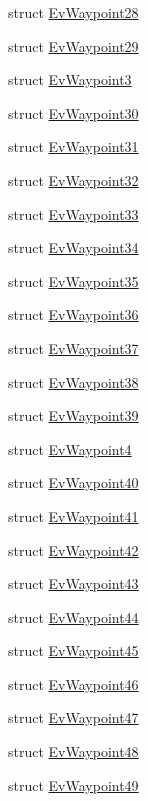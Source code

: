 \begin{DoxyCompactItemize}
\item 
struct \hyperlink{structsmacc_1_1EvWaypoint28}{Ev\+Waypoint28}
\item 
struct \hyperlink{structsmacc_1_1EvWaypoint29}{Ev\+Waypoint29}
\item 
struct \hyperlink{structsmacc_1_1EvWaypoint3}{Ev\+Waypoint3}
\item 
struct \hyperlink{structsmacc_1_1EvWaypoint30}{Ev\+Waypoint30}
\item 
struct \hyperlink{structsmacc_1_1EvWaypoint31}{Ev\+Waypoint31}
\item 
struct \hyperlink{structsmacc_1_1EvWaypoint32}{Ev\+Waypoint32}
\item 
struct \hyperlink{structsmacc_1_1EvWaypoint33}{Ev\+Waypoint33}
\item 
struct \hyperlink{structsmacc_1_1EvWaypoint34}{Ev\+Waypoint34}
\item 
struct \hyperlink{structsmacc_1_1EvWaypoint35}{Ev\+Waypoint35}
\item 
struct \hyperlink{structsmacc_1_1EvWaypoint36}{Ev\+Waypoint36}
\item 
struct \hyperlink{structsmacc_1_1EvWaypoint37}{Ev\+Waypoint37}
\item 
struct \hyperlink{structsmacc_1_1EvWaypoint38}{Ev\+Waypoint38}
\item 
struct \hyperlink{structsmacc_1_1EvWaypoint39}{Ev\+Waypoint39}
\item 
struct \hyperlink{structsmacc_1_1EvWaypoint4}{Ev\+Waypoint4}
\item 
struct \hyperlink{structsmacc_1_1EvWaypoint40}{Ev\+Waypoint40}
\item 
struct \hyperlink{structsmacc_1_1EvWaypoint41}{Ev\+Waypoint41}
\item 
struct \hyperlink{structsmacc_1_1EvWaypoint42}{Ev\+Waypoint42}
\item 
struct \hyperlink{structsmacc_1_1EvWaypoint43}{Ev\+Waypoint43}
\item 
struct \hyperlink{structsmacc_1_1EvWaypoint44}{Ev\+Waypoint44}
\item 
struct \hyperlink{structsmacc_1_1EvWaypoint45}{Ev\+Waypoint45}
\item 
struct \hyperlink{structsmacc_1_1EvWaypoint46}{Ev\+Waypoint46}
\item 
struct \hyperlink{structsmacc_1_1EvWaypoint47}{Ev\+Waypoint47}
\item 
struct \hyperlink{structsmacc_1_1EvWaypoint48}{Ev\+Waypoint48}
\item 
struct \hyperlink{structsmacc_1_1EvWaypoint49}{Ev\+Waypoint49}

\end{DoxyCompactItemize}
